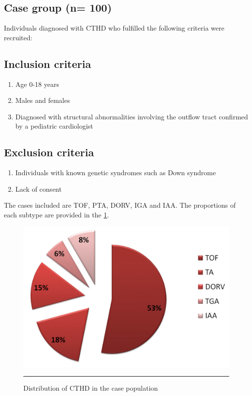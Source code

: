 \begin{refsection}
\subsection{Case group (n= 100)}
Individuals diagnosed with CTHD who fulfilled the following criteria were recruited:

\subsection{Inclusion criteria}
\begin{enumerate}
\item Age 0-18 years 
\item Males and females 
\item Diagnosed with structural abnormalities involving the outflow tract confirmed by a
pediatric cardiologist
\end{enumerate}
	
\subsection{Exclusion criteria}
\begin{enumerate}
\item Individuals with known genetic syndromes such as Down syndrome
\item Lack of consent
\end{enumerate}
	
The cases included are TOF, PTA, DORV, IGA and IAA.  The proportions of each subtype are provided in the \cref{fig:2_1casepopln}.

\begin{figure}[!b]
\centering
\includegraphics[scale=0.25,keepaspectratio]{Figures/2_1casepopln.pdf} 
\rule{35em}{0.5pt}
\caption{Distribution of CTHD in the case population}
\label{fig:2_1casepopln}
\end{figure}


\end{refsection}
